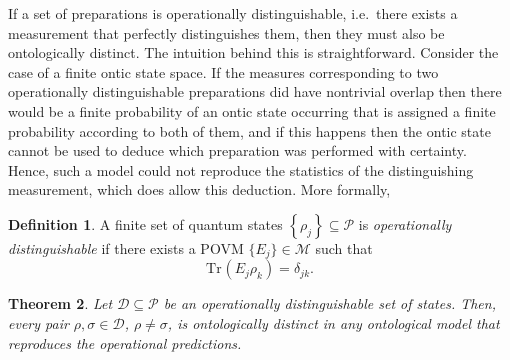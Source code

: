 \documentclass[DIV=calc,fontsize=12pt]{scrartcl} %
\theoremstyle{definition}
\newtheorem{definition}{Definition}[section]
\theoremstyle{plain}
\newtheorem{theorem}[definition]{Theorem}
\newcommand{\Tr}[2][]{\ensuremath{\text{Tr}_{#1} \left ( #2 \right )}}
\begin{document}
If a set of preparations is operationally distinguishable, i.e.\ there
exists a measurement that perfectly distinguishes them, then they must
also be ontologically distinct.  The intuition behind this is
straightforward.  Consider the case of a finite ontic state space.  If
the measures corresponding to two operationally distinguishable
preparations did have nontrivial overlap then there would be a finite
probability of an ontic state occurring that is assigned a finite
probability according to both of them, and if this happens then the
ontic state cannot be used to deduce which preparation was performed
with certainty.  Hence, such a model could not reproduce the
statistics of the distinguishing measurement, which does allow this
deduction.  More formally,
\begin{definition}
A finite set of quantum states $\left \{ \rho_j \right \} \subseteq
\mathcal{P}$ is \emph{operationally distinguishable} if there exists
a POVM $\{E_j\} \in \mathcal{M}$ such that
\begin{equation}
\Tr{E_j \rho_k} = \delta_{jk}.
\end{equation}
\end{definition}
\begin{theorem}
\label{prop:POEM:distinguish}
Let $\mathcal{D} \subseteq \mathcal{P}$ be an operationally
distinguishable set of states.  Then, every pair $\rho, \sigma \in
\mathcal{D}$, $\rho \neq \sigma$, is ontologically distinct in any
ontological model that reproduces the operational predictions.
\end{theorem}
\end{document}
